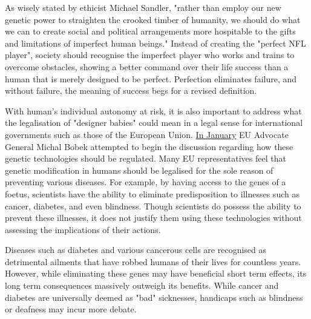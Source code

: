   As wisely stated by ethicist Michael Sandler, "rather than employ our
   new genetic power to straighten the crooked timber of humanity, we
   should do what we can to create social and political arrangements more
   hospitable to the gifts and limitations of imperfect human beings."
   Instead of creating the "perfect NFL player", society should recognise
   the imperfect player who works and trains to overcome obstacles,
   showing a better command over their life success than a human that is
   merely designed to be perfect. Perfection eliminates failure, and
   without failure, the meaning of success begs for a revised definition.

   With human's individual autonomy at risk, it is also important to
   address what the legalisation of "designer babies" could mean in a
   legal sense for international governments such as those of the European
   Union. \href{https://allianceforscience.cornell.edu/blog/2018/01/european-union-opinion-on-gene-editing-insightful-or-missed-opportunity/}{In January} EU Advocate General Michal Bobek attempted to
   begin the discussion regarding how these genetic technologies should be
   regulated. Many EU representatives feel that genetic modification in
   humans should be legalised for the sole reason of preventing various
   diseases. For example, by having access to the genes of a foetus,
   scientists have the ability to eliminate predisposition to illnesses
   such as cancer, diabetes, and even blindness. Though scientists do
   possess the ability to prevent these illnesses, it does not justify
   them using these technologies without assessing the implications of
   their actions.

   Diseases such as diabetes and various cancerous cells are recognised as
   detrimental ailments that have robbed humans of their lives for
   countless years. However, while eliminating these genes may have
   beneficial short term effects, its long term consequences massively
   outweigh its benefits. While cancer and diabetes are universally deemed
   as "bad" sicknesses, handicaps such as blindness or deafness may incur
   more debate.

